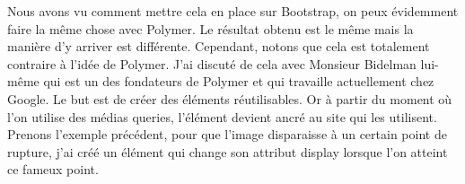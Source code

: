 \documentclass{article}
\begin{document}
Nous avons vu comment mettre cela en place sur Bootstrap, on peux \'evidemment faire la m\^eme chose avec Polymer. Le r\'esultat obtenu est le m\^eme mais la mani\`ere d'y arriver est diff\'erente. Cependant, notons que cela est totalement contraire \`a l'id\'ee de Polymer. J'ai discut\'e de cela avec Monsieur Bidelman lui-m\^eme qui est un des fondateurs de Polymer et qui travaille actuellement chez Google. Le but est de cr\'eer des \'el\'ements r\'eutilisables. Or \`a partir du moment o\`u l'on utilise des m\'edias queries, l'\'el\'ement devient ancr\'e au site qui les utilisent. Prenons l'exemple pr\'ec\'edent, pour que l'image disparaisse \`a un certain point de rupture, j'ai cr\'e\'e un \'el\'ement qui change son attribut \og display \fg{} lorsque l'on atteint ce fameux point.
\vspace{0.5cm}\\
\end{document}
